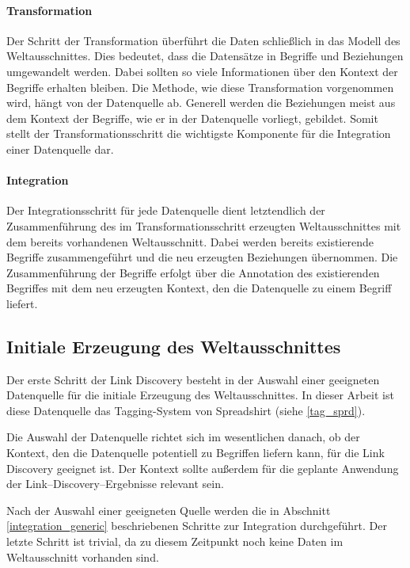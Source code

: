 \paragraph{Transformation}

Der Schritt der Transformation überführt die Daten schließlich in das Modell des Weltausschnittes. Dies bedeutet, dass die Datensätze in Begriffe und Beziehungen umgewandelt werden. Dabei sollten so viele Informationen über den Kontext der Begriffe erhalten bleiben. Die Methode, wie diese Transformation vorgenommen wird, hängt von der Datenquelle ab. Generell werden die Beziehungen meist aus dem Kontext der Begriffe, wie er in der Datenquelle vorliegt, gebildet. Somit stellt der Transformationsschritt die wichtigste Komponente für die Integration einer Datenquelle dar.

\paragraph{Integration}

Der Integrationsschritt für jede Datenquelle dient letztendlich der Zusammenführung des im Transformationsschritt erzeugten Weltausschnittes mit dem bereits vorhandenen Weltausschnitt. Dabei werden bereits existierende Begriffe zusammengeführt und die neu erzeugten Beziehungen übernommen. Die Zusammenführung der Begriffe erfolgt über die Annotation des existierenden Begriffes mit dem neu erzeugten Kontext, den die Datenquelle zu einem Begriff liefert.

\subsection{Initiale Erzeugung des Weltausschnittes}

Der erste Schritt der Link Discovery besteht in der Auswahl einer geeigneten Datenquelle für die initiale Erzeugung des Weltausschnittes. In dieser Arbeit ist diese Datenquelle das Tagging-System von Spreadshirt (siehe \ref{tag_sprd}).

Die Auswahl der Datenquelle richtet sich im wesentlichen danach, ob der Kontext, den die Datenquelle potentiell zu Begriffen liefern kann, für die Link Discovery geeignet ist. Der Kontext sollte außerdem für die geplante Anwendung der Link--Discovery--Ergebnisse relevant sein.

Nach der Auswahl einer geeigneten Quelle werden die in Abschnitt \ref{integration_generic} beschriebenen Schritte zur Integration durchgeführt. Der letzte Schritt ist trivial, da zu diesem Zeitpunkt noch keine Daten im Weltausschnitt vorhanden sind.

